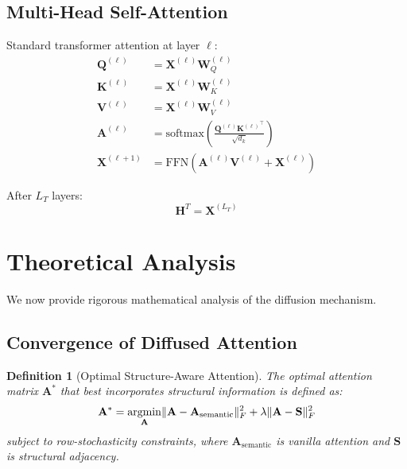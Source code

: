 \documentclass[11pt]{article}
\newtheorem{definition}{Definition}
\DeclareMathOperator*{\argmin}{argmin}
\DeclarePairedDelimiter{\norm}{\lVert}{\rVert}
\begin{document}
\subsection{Multi-Head Self-Attention}

Standard transformer attention at layer $\ell$:
\begin{align}
    \mathbf{Q}^{(\ell)} &= \mathbf{X}^{(\ell)} \mathbf{W}_Q^{(\ell)} \\
    \mathbf{K}^{(\ell)} &= \mathbf{X}^{(\ell)} \mathbf{W}_K^{(\ell)} \\
    \mathbf{V}^{(\ell)} &= \mathbf{X}^{(\ell)} \mathbf{W}_V^{(\ell)} \\
    \mathbf{A}^{(\ell)} &= \text{softmax}\left(\frac{\mathbf{Q}^{(\ell)} {\mathbf{K}^{(\ell)}}^\top}{\sqrt{d_k}}\right) \label{eq:vanilla_attn} \\
    \mathbf{X}^{(\ell+1)} &= \text{FFN}(\mathbf{A}^{(\ell)} \mathbf{V}^{(\ell)} + \mathbf{X}^{(\ell)})
\end{align}

After $L_T$ layers:
\begin{equation}
    \mathbf{H}^T = \mathbf{X}^{(L_T)}
\end{equation}



\section{Theoretical Analysis}
\label{sec:theory}

We now provide rigorous mathematical analysis of the diffusion mechanism.

\subsection{Convergence of Diffused Attention}

\begin{definition}[Optimal Structure-Aware Attention]
The optimal attention matrix $\mathbf{A}^*$ that best incorporates structural information is defined as:
\begin{equation}
    \mathbf{A}^* = \argmin_{\mathbf{A}} \norm{\mathbf{A} - \mathbf{A}_{\text{semantic}}}^2_F + \lambda \norm{\mathbf{A} - \mathbf{S}}^2_F
\end{equation}
subject to row-stochasticity constraints, where $\mathbf{A}_{\text{semantic}}$ is vanilla attention and $\mathbf{S}$ is structural adjacency.
\end{definition}
\end{document}
